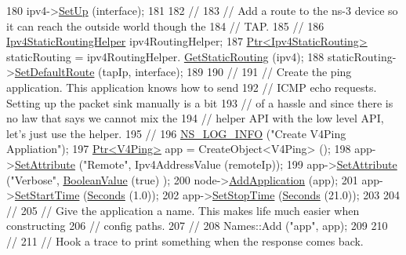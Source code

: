\begin{DoxyCode}
180   ipv4->\hyperlink{classns3_1_1Ipv4_a71b2f8acca4923aef907b50b3196bf23}{SetUp} (interface);
181 
182   \textcolor{comment}{//}
183   \textcolor{comment}{// Add a route to the ns-3 device so it can reach the outside world though the}
184   \textcolor{comment}{// TAP.}
185   \textcolor{comment}{//}
186   \hyperlink{classns3_1_1Ipv4StaticRoutingHelper}{Ipv4StaticRoutingHelper} ipv4RoutingHelper;
187   \hyperlink{classns3_1_1Ptr}{Ptr<Ipv4StaticRouting>} staticRouting = ipv4RoutingHelper.
      \hyperlink{classns3_1_1Ipv4StaticRoutingHelper_a731206e50d305695dac7fb2ef963a4bb}{GetStaticRouting} (ipv4);
188   staticRouting->\hyperlink{classns3_1_1Ipv4StaticRouting_aee30fa3246c2b42f122dabdff2725331}{SetDefaultRoute} (tapIp, interface);
189 
190   \textcolor{comment}{//}
191   \textcolor{comment}{// Create the ping application.  This application knows how to send}
192   \textcolor{comment}{// ICMP echo requests.  Setting up the packet sink manually is a bit}
193   \textcolor{comment}{// of a hassle and since there is no law that says we cannot mix the}
194   \textcolor{comment}{// helper API with the low level API, let's just use the helper.}
195   \textcolor{comment}{//}
196   \hyperlink{group__logging_gafbd73ee2cf9f26b319f49086d8e860fb}{NS\_LOG\_INFO} (\textcolor{stringliteral}{"Create V4Ping Appliation"});
197   \hyperlink{classns3_1_1Ptr}{Ptr<V4Ping>} app = CreateObject<V4Ping> ();
198   app->\hyperlink{classns3_1_1ObjectBase_ac60245d3ea4123bbc9b1d391f1f6592f}{SetAttribute} (\textcolor{stringliteral}{"Remote"}, Ipv4AddressValue (remoteIp));
199   app->\hyperlink{classns3_1_1ObjectBase_ac60245d3ea4123bbc9b1d391f1f6592f}{SetAttribute} (\textcolor{stringliteral}{"Verbose"}, \hyperlink{classns3_1_1BooleanValue}{BooleanValue} (\textcolor{keyword}{true}) );
200   node->\hyperlink{classns3_1_1Node_ab98b4fdc4aadc86366b80e8a79a53f47}{AddApplication} (app);
201   app->\hyperlink{classns3_1_1Application_a8360a49748e30c52ffdcc7a305c3cd48}{SetStartTime} (\hyperlink{group__timecivil_ga33c34b816f8ff6628e33d5c8e9713b9e}{Seconds} (1.0));
202   app->\hyperlink{classns3_1_1Application_a732c1fdadf0be176c753a2ce6e27dff9}{SetStopTime} (\hyperlink{group__timecivil_ga33c34b816f8ff6628e33d5c8e9713b9e}{Seconds} (21.0));
203 
204   \textcolor{comment}{//}
205   \textcolor{comment}{// Give the application a name.  This makes life much easier when constructing}
206   \textcolor{comment}{// config paths.}
207   \textcolor{comment}{//}
208   Names::Add (\textcolor{stringliteral}{"app"}, app);
209 
210   \textcolor{comment}{//}
211   \textcolor{comment}{// Hook a trace to print something when the response comes back.}

\end{DoxyCode}
